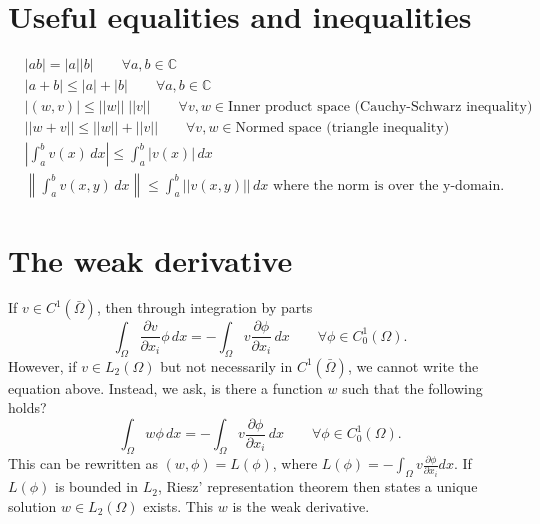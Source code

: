 \documentclass[oneside,a4paper,11pt]{report}
\begin{document}
\section{Useful equalities and inequalities}
\begin{align}
    &|ab| = |a||b| \qquad \forall a,b \in \mathbb{C} \\
    &|a + b| \le |a| + |b| \qquad \forall a,b \in \mathbb{C} \\
    &|(w,v)| \le ||w||\;||v|| \qquad \forall v,w \in \text{Inner product space (Cauchy-Schwarz inequality)} \\
    &||w + v|| \le ||w|| + ||v|| \qquad \forall v,w \in \text{Normed space (triangle inequality)} \\
    &\left | \int_a^b v(x) \, dx \right| \le \int_a^b |v(x)| \, dx \\
    &\left \| \int_a^b v(x,y) \, dx \right \| \le \int_a^b ||v(x,y)|| \, dx \text{ where the norm is over the y-domain}.
\end{align}

\section{The weak derivative}
If $v \in C^1(\bar{\Omega})$, then through integration by parts
\begin{equation}
    \int_\Omega \frac{\partial v}{\partial x_i} \phi \, dx = -\int_\Omega v \frac{\partial \phi}{\partial x_i} \, dx \qquad \forall \phi \in C_0^1(\Omega).
\end{equation}
However, if $v \in L_2(\Omega)$ but not necessarily in $C^1(\bar{\Omega})$, we cannot write the equation above. Instead, we ask, is there a function $w$ such that the following holds?
\begin{equation}
     \int_\Omega w \phi \, dx = -\int_\Omega v \frac{\partial \phi}{\partial x_i} \, dx \qquad \forall \phi \in C_0^1(\Omega).
\end{equation}
This can be rewritten as $(w,\phi) = L(\phi)$, where $L(\phi) = -\int_\Omega v \frac{\partial \phi}{\partial x_i}dx$. If $L(\phi)$ is bounded in $L_2$, Riesz' representation theorem then states a unique solution $w \in L_2(\Omega)$ exists. This $w$ is the weak derivative.
\end{document}
